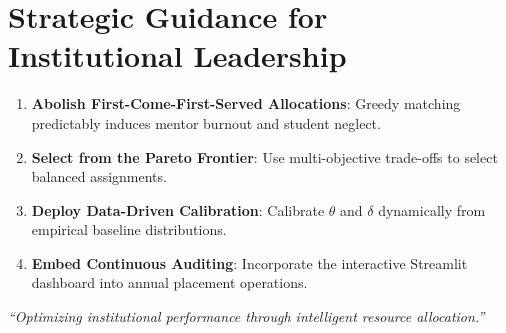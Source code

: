 \documentclass[11pt,a4paper,oneside]{report}
\begin{document}
\section{Strategic Guidance for Institutional Leadership}
\begin{enumerate}
    \item \textbf{Abolish First-Come-First-Served Allocations}: Greedy matching predictably induces mentor burnout and student neglect.
    \item \textbf{Select from the Pareto Frontier}: Use multi-objective trade-offs to select balanced assignments.
    \item \textbf{Deploy Data-Driven Calibration}: Calibrate $\theta$ and $\delta$ dynamically from empirical baseline distributions.
    \item \textbf{Embed Continuous Auditing}: Incorporate the interactive Streamlit dashboard into annual placement operations.
\end{enumerate}

\vspace{1.0cm}
\begin{center}
\textit{``Optimizing institutional performance through intelligent resource allocation.''}
\end{center}
\end{document}

